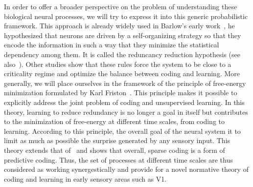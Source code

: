 \documentclass[draft]{article} %
\begin{document}
In order to offer a broader perspective on the problem of understanding these biological neural processes, we will try to express it into this generic probabilistic framework.
This approach is already widely used in Barlow's early work~\citep{Barlow61}, he hypothesized that neurons are driven by a self-organizing strategy so that they encode the information in such a way that they minimize the statistical dependency among them. It is called the reduncancy reduction hypothesis (see also~\citep{Atick92}). %
Other studies show that these rules force the system to be close to a criticality regime and optimize the balance between coding and learning. %
More generally, we will place ourselves in the framework of the principle of free-energy minimization formulated by Karl Friston~\citep{Friston12}. This principle makes it possible to explicitly address the joint problem of coding and unsupervised learning. In this theory, learning to reduce redundancy is no longer a goal in itself but contributes to the minimization of free-energy at different time scales, from coding to learning. %
According to this principle, the overall goal of the neural system it to limit as much as possible the surprise generated by any sensory input.
This theory extends that of~\citep{Olshausen97} and shows that overall, sparse coding is a form of predictive coding. Thus, the set of processes at different time scales are thus considered as working synergestically and provide for a novel normative theory of coding and learning in early sensory areas such as V1.
\end{document}
